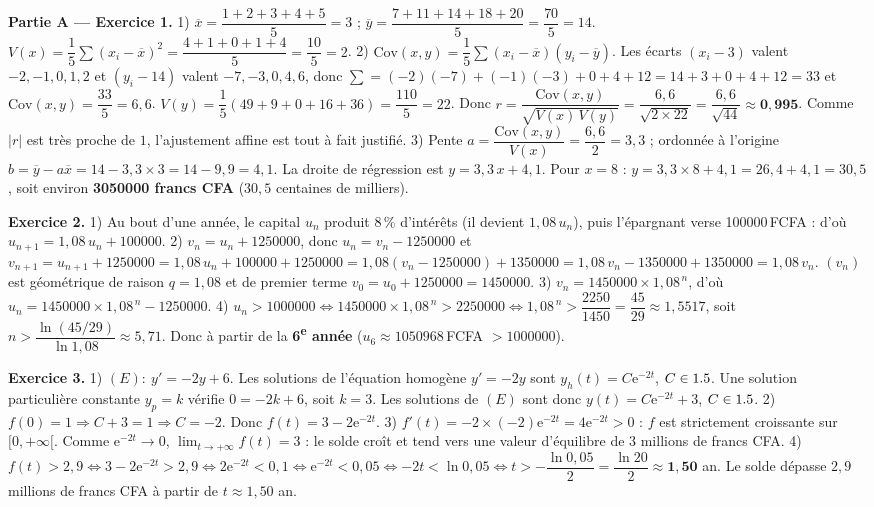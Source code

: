 
\noindent\textbf{Partie A — Exercice 1.}
1) $\overline{x}=\dfrac{1+2+3+4+5}{5}=3$ ; $\overline{y}=\dfrac{7+11+14+18+20}{5}=\dfrac{70}{5}=14$.
$V(x)=\dfrac15\sum(x_i-\overline{x})^2=\dfrac{4+1+0+1+4}{5}=\dfrac{10}{5}=2$.
2) $\mathrm{Cov}(x,y)=\dfrac15\sum(x_i-\overline{x})(y_i-\overline{y})$. Les écarts
$(x_i-3)$ valent $-2,-1,0,1,2$ et $(y_i-14)$ valent $-7,-3,0,4,6$, donc
$\sum=(-2)(-7)+(-1)(-3)+0+4+12=14+3+0+4+12=33$ et $\mathrm{Cov}(x,y)=\dfrac{33}{5}=6{,}6$.
$V(y)=\dfrac15(49+9+0+16+36)=\dfrac{110}{5}=22$. Donc
$r=\dfrac{\mathrm{Cov}(x,y)}{\sqrt{V(x)\,V(y)}}=\dfrac{6{,}6}{\sqrt{2\times22}}=\dfrac{6{,}6}{\sqrt{44}}\approx\mathbf{0{,}995}$.
Comme $|r|$ est très proche de $1$, l'ajustement affine est tout à fait justifié.
3) Pente $a=\dfrac{\mathrm{Cov}(x,y)}{V(x)}=\dfrac{6{,}6}{2}=3{,}3$ ; ordonnée à l'origine
$b=\overline{y}-a\overline{x}=14-3{,}3\times3=14-9{,}9=4{,}1$. La droite de régression est
$y=3{,}3\,x+4{,}1$. Pour $x=8$ : $y=3{,}3\times8+4{,}1=26{,}4+4{,}1=30{,}5$, soit environ
\textbf{\num{3050000} francs CFA} ($30{,}5$ centaines de milliers).

\smallskip
\noindent\textbf{Exercice 2.}
1) Au bout d'une année, le capital $u_n$ produit $8\,\%$ d'intérêts (il devient
$1{,}08\,u_n$), puis l'épargnant verse \num{100000}\,FCFA : d'où
$u_{n+1}=1{,}08\,u_n+\num{100000}$.
2) $v_n=u_n+\num{1250000}$, donc $u_n=v_n-\num{1250000}$ et
$v_{n+1}=u_{n+1}+\num{1250000}=1{,}08\,u_n+\num{100000}+\num{1250000}
=1{,}08(v_n-\num{1250000})+\num{1350000}=1{,}08\,v_n-\num{1350000}+\num{1350000}=1{,}08\,v_n$.
$(v_n)$ est géométrique de raison $q=1{,}08$ et de premier terme
$v_0=u_0+\num{1250000}=\num{1450000}$.
3) $v_n=\num{1450000}\times1{,}08^{\,n}$, d'où
$u_n=\num{1450000}\times1{,}08^{\,n}-\num{1250000}$.
4) $u_n>\num{1000000}\iff\num{1450000}\times1{,}08^{\,n}>\num{2250000}
\iff1{,}08^{\,n}>\dfrac{2250}{1450}=\dfrac{45}{29}\approx1{,}5517$, soit
$n>\dfrac{\ln(45/29)}{\ln1{,}08}\approx5{,}71$. Donc à partir de la \textbf{6\textsuperscript{e} année}
($u_6\approx\num{1050968}$\,FCFA $>\num{1000000}$).

\smallskip
\noindent\textbf{Exercice 3.}
1) $(E):\ y'=-2y+6$. Les solutions de l'équation homogène $y'=-2y$ sont
$y_h(t)=C\mathrm{e}^{-2t}$, $C\in1.5$. Une solution particulière constante $y_p=k$ vérifie
$0=-2k+6$, soit $k=3$. Les solutions de $(E)$ sont donc
$y(t)=C\mathrm{e}^{-2t}+3$, $C\in1.5$.
2) $f(0)=1\Rightarrow C+3=1\Rightarrow C=-2$. Donc $f(t)=3-2\mathrm{e}^{-2t}$.
3) $f'(t)=-2\times(-2)\mathrm{e}^{-2t}=4\mathrm{e}^{-2t}>0$ : $f$ est strictement croissante
sur $[0,+\infty[$. Comme $\mathrm{e}^{-2t}\to0$, $\displaystyle\lim_{t\to+\infty}f(t)=3$ :
le solde croît et tend vers une valeur d'équilibre de $3$ millions de francs CFA.
4) $f(t)>2{,}9\iff3-2\mathrm{e}^{-2t}>2{,}9\iff2\mathrm{e}^{-2t}<0{,}1\iff\mathrm{e}^{-2t}<0{,}05
\iff-2t<\ln0{,}05\iff t>-\dfrac{\ln0{,}05}{2}=\dfrac{\ln20}{2}\approx\mathbf{1{,}50}$ an.
Le solde dépasse $2{,}9$ millions de francs CFA à partir de $t\approx1{,}50$ an.

